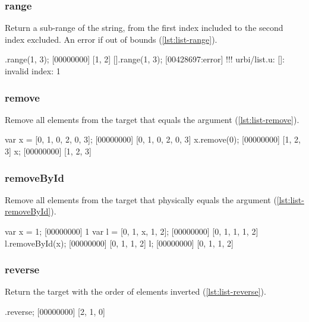 \subsubsection{range}

Return a sub-range of the string, from the first index included to the
second index excluded. An error if out of bounds (\autoref{lst:list-range}).

\begin{urbiscript}[caption=List.range, label=lst:list-range]
[0, 1, 2, 3].range(1, 3);
[00000000] [1, 2]
[].range(1, 3);
[00428697:error] !!! urbi/list.u: []: invalid index: 1
\end{urbiscript}


\subsubsection{remove}

Remove all elements from the target that equals the argument
(\autoref{lst:list-remove}).

\begin{urbiscript}[caption=List.remove, label=lst:list-remove]
var x = [0, 1, 0, 2, 0, 3];
[00000000] [0, 1, 0, 2, 0, 3]
x.remove(0);
[00000000] [1, 2, 3]
x;
[00000000] [1, 2, 3]
\end{urbiscript}

\subsubsection{removeById}

Remove all elements from the target that physically equals the
argument (\autoref{lst:list-removeById}).

\begin{urbiscript}[caption=List.removeById, label=lst:list-removeById]
var x = 1;
[00000000] 1
var l = [0, 1, x, 1, 2];
[00000000] [0, 1, 1, 1, 2]
l.removeById(x);
[00000000] [0, 1, 1, 2]
l;
[00000000] [0, 1, 1, 2]
\end{urbiscript}

\subsubsection{reverse}

Return the target with the order of elements inverted
(\autoref{lst:list-reverse}).

\begin{urbiscript}[caption=List.reverse, label=lst:list-reverse]
[0, 1, 2].reverse;
[00000000] [2, 1, 0]
\end{urbiscript}


